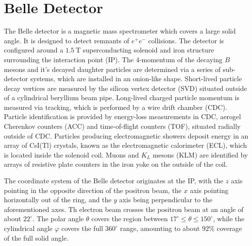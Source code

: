 \documentclass[headings=standardclasses,headings=big,oneside,a4paper,openany,12pt]{scrbook}
\newcommand {\e}[1]{\mathrm{~#1}}
\begin{document}
\section{Belle Detector}
The Belle detector is a magnetic mass spectrometer which covers a large solid angle. It is designed to detect remnants of $e^+e^-$ collisions. The detector is configured around a $1.5\e{T}$ superconducting solenoid and iron structure surrounding the interaction point (IP). The 4-momentum of the decaying $B$ mesons and it's decayed daughter particles are determined via a series of sub-detector systems, which are installed in an onion-like shape. Short-lived particle decay vertices are measured by the silicon vertex detector (SVD) situated outside of a cylindrical beryllium beam pipe. Long-lived charged particle momentum is measured via tracking, which is performed by a wire drift chamber (CDC). Particle identification is provided by energy-loss measurements in CDC, aerogel Cherenkov counters (ACC) and time-of-flight counters (TOF), situated radially outside of CDC. Particles producing electromagnetic showers deposit energy in an array of CsI(Tl) crystals, known as the electromagnetic calorimeter (ECL), which is located inside the solenoid coil. Muons and $K_L$ mesons (KLM) are identified by arrays of resistive plate counters in the iron yoke on the outside of the coil. 

The coordinate system of the Belle detector originates at the IP, with the $z$ axis pointing in the opposite direction of the positron beam, the $x$ axis pointing horizontally out of the ring, and the $y$ axis being perpendicular to the aforementioned axes. Th electron beam crosses the positron beam at an angle of about $22^\circ$. The polar angle $\theta$ covers the region between $17^\circ \leq \theta \leq 150^\circ$, while the cylindrical angle $\varphi$ covers the full $360^\circ$ range, amounting to about $92\%$ coverage of the full solid angle.


\end{document}
